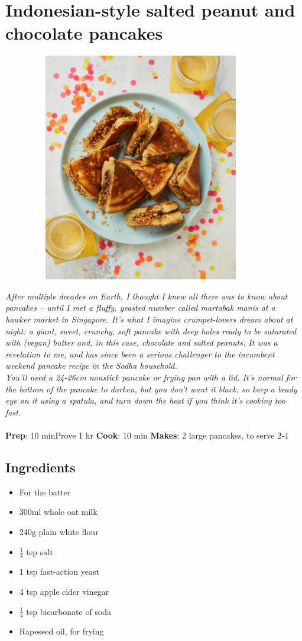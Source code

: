 \documentclass{book}
\begin{document}
\section{Indonesian-style salted peanut and chocolate pancakes}
\begin{figure}
\centering\includegraphics[width=10cm,height=10cm,keepaspectratio]{Recipe_Pictures/Indonesian-style_salted_peanut_and_chocolate_pancakes.png}
\end{figure}
\emph{After multiple decades on Earth, I thought I knew all there was to know about pancakes – until I met a fluffy, yeasted number called martabak manis at a hawker market in Singapore. It’s what I imagine crumpet-lovers dream about at night: a giant, sweet, crunchy, soft pancake with deep holes ready to be saturated with (vegan) butter and, in this case, chocolate and salted peanuts. It was a revelation to me, and has since been a serious challenger to the incumbent weekend pancake recipe in the Sodha household.\\ 
You’ll need a 24-26cm nonstick pancake or frying pan with a lid. It’s normal for the bottom of the pancake to darken, but you don’t want it black, so keep a beady eye on it using a spatula, and turn down the heat if you think it’s cooking too fast.}\\\\ 
\textbf{Prep}: 10 minProve 1 hr
\textbf{Cook}: 10 min
\textbf{Makes}: 2 large pancakes, to serve 2-4
\subsection*{Ingredients}
\begin{itemize}
\item For the batter
\item 300ml whole oat milk
\item 240g plain white flour
\item $\frac{1}{4}$ tsp salt
\item 1 tsp fast-action yeast
\item 4 tsp apple cider vinegar
\item $\frac{1}{4}$ tsp bicarbonate of soda
\item Rapeseed oil, for frying
\end{itemize}
\end{document}

